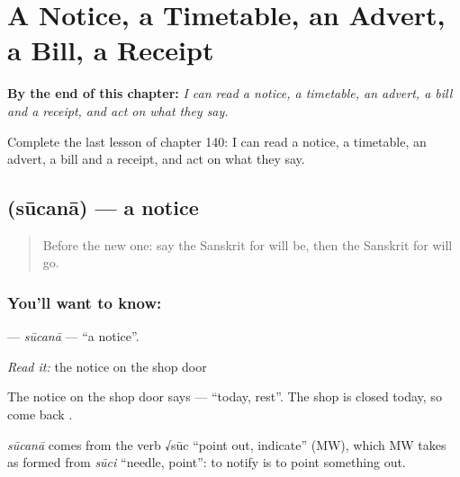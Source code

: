 
\chapter{A Notice, a Timetable, an Advert, a Bill, a Receipt}
\label{ch:sa-a-notice-a-timetable-an-advert-a-bill-a-receipt}

\begin{chapteropening}
\textbf{By the end of this chapter:} \emph{I can read a notice, a timetable, an advert, a bill and a receipt, and act on what they say.}

Complete the last lesson of chapter 140: I can read a notice, a timetable, an advert, a bill and a receipt, and act on what they say.
\end{chapteropening}

\section[\texorpdfstring{\sk{सूचना} (sūcanā)}{सूचना (sūcanā)}]{ (sūcanā) — a notice}

\label{lesson:SA-C140-sucana}



\begin{quote}
Before the new one: say the Sanskrit for will be, then the Sanskrit for will go.
\end{quote}

\subsection*{You'll want to know: }
\textbf{} — \emph{sūcanā} — \textquotedblleft{}a notice\textquotedblright{}.

\emph{Read it:} the notice on the shop door

The notice on the shop door says \textbf{ } — \textquotedblleft{}today, rest\textquotedblright{}. The shop is closed today, so come back \textbf{}.

\begin{cousinweb}
\emph{sūcanā} comes from the verb √sūc \textquotedblleft{}point out, indicate\textquotedblright{} (MW), which MW takes as formed from \emph{sūci} \textquotedblleft{}needle, point\textquotedblright{}: to notify is to point something out.
\end{cousinweb}

